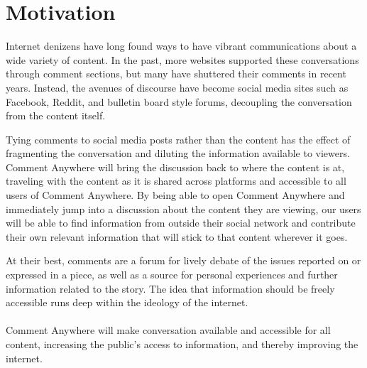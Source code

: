 \documentclass[proposal.tex]{subfiles}
\begin{document}
    
\section{Motivation}

Internet denizens have long found ways to have vibrant communications about a wide variety of content. In the past, more websites supported these conversations through comment sections, but many have shuttered their comments in recent years. Instead, the avenues of discourse have become social media sites such as Facebook, Reddit, and bulletin board style forums, decoupling the conversation from the content itself.

Tying comments to social media posts rather than the content has the effect of fragmenting the conversation and diluting the information available to viewers. Comment Anywhere will bring the discussion back to where the content is at, traveling with the content as it is shared across platforms and accessible to all users of Comment Anywhere. By being able to open Comment Anywhere and immediately jump into a discussion about the content they are viewing, our users will be able to find information from outside their social network and contribute their own relevant information that will stick to that content wherever it goes.

At their best, comments are a forum for lively debate of the issues reported on or expressed in a piece, as well as a source for personal experiences and further information related to the story. The idea that information should be freely accessible runs deep within the ideology of the internet.
\\\\
Comment Anywhere will make conversation available and accessible for all content, increasing the public's access to information, and thereby improving the internet.
\end{document}
